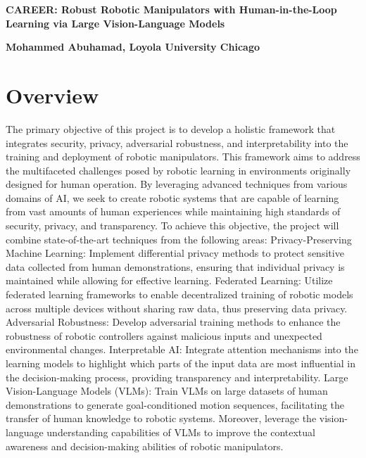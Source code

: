 \documentclass[11pt]{NSF}
\renewcommand{\title}[1]{\begin{center}\LARGE\bfseries{#1}\end{center}}
\newcommand*\cib[1]{\tikz[baseline=(char.base)]{
                \node[shape=circle,fill=black,text=white,draw,inner sep=0.3pt] (char) {#1};}}
\begin{document}
%
%
\pagestyle{empty} 
%
%
\setlength{\baselineskip}{12.6pt} %
\setlength{\normalbaselineskip}{12.6pt} %



\title{\Large
CAREER: Robust Robotic Manipulators with Human-in-the-Loop Learning via Large Vision-Language Models}
\begin{center}
   {\bfseries\filcenter
Mohammed Abuhamad, Loyola University Chicago} 
\end{center}



\section{Overview}

The primary objective of this project is to develop a holistic framework that integrates security, privacy, adversarial robustness, and interpretability into the training and deployment of robotic manipulators. This framework aims to address the multifaceted challenges posed by robotic learning in environments originally designed for human operation. By leveraging advanced techniques from various domains of AI, we seek to create robotic systems that are capable of learning from vast amounts of human experiences while maintaining high standards of security, privacy, and transparency.
To achieve this objective, the project will combine state-of-the-art techniques from the following areas:
\cib{1} Privacy-Preserving Machine Learning:
Implement differential privacy methods to protect sensitive data collected from human demonstrations, ensuring that individual privacy is maintained while allowing for effective learning.
\cib{2} Federated Learning: Utilize federated learning frameworks to enable decentralized training of robotic models across multiple devices without sharing raw data, thus preserving data privacy.
\cib{3} Adversarial Robustness:
Develop adversarial training methods to enhance the robustness of robotic controllers against malicious inputs and unexpected environmental changes.
\cib{4} Interpretable AI:
Integrate attention mechanisms into the learning models to highlight which parts of the input data are most influential in the decision-making process, providing transparency and interpretability.
\cib{5} Large Vision-Language Models (VLMs):
Train VLMs on large datasets of human demonstrations to generate goal-conditioned motion sequences, facilitating the transfer of human knowledge to robotic systems.
Moreover, leverage the vision-language understanding capabilities of VLMs to improve the contextual awareness and decision-making abilities of robotic manipulators.
\end{document}
